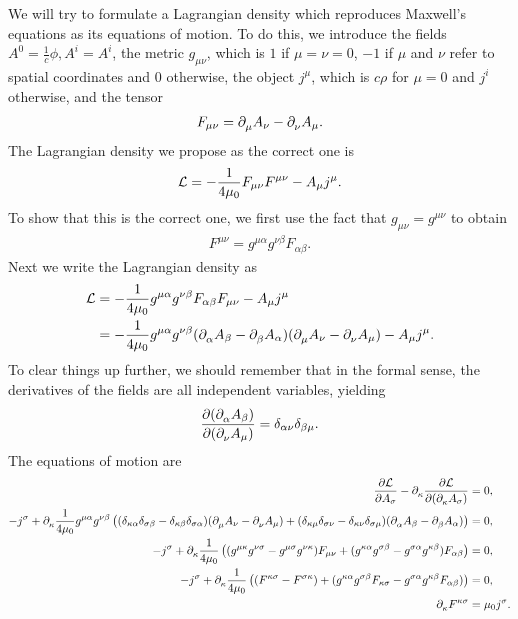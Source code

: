 We will try to formulate a Lagrangian density which reproduces Maxwell's equations as its equations of motion. To do this, we introduce the fields $A^{0} = \frac{1}{c}\phi, A^{i} = A^{i}$, the metric $g_{\mu\nu}$, which is $1$ if $\mu = \nu = 0$, $-1$ if $\mu$ and $\nu$ refer to spatial coordinates and $0$ otherwise, the object $j^{\mu}$, which is $c\rho$ for $\mu = 0$ and $j^{i}$ otherwise, and the tensor
\begin{align*}
	F_{\mu\nu} = \partial^{}_{\mu}{A_{\nu}} - \partial^{}_{\nu}{A_{\mu}}.
\end{align*}
The Lagrangian density we propose as the correct one is
\begin{align*}
	\mathcal{L} = -\frac{1}{4\mu_{0}}F_{\mu\nu}F^{\mu\nu} - A_{\mu}j^{\mu}.
\end{align*}
To show that this is the correct one, we first use the fact that $g_{\mu\nu} = g^{\mu\nu}$ to obtain
\begin{align*}
	F^{\mu\nu} = g^{\mu\alpha}g^{\nu\beta}F_{\alpha\beta}.
\end{align*}
Next we write the Lagrangian density as
\begin{align*}
	\mathcal{L} &= -\frac{1}{4\mu_{0}}g^{\mu\alpha}g^{\nu\beta}F_{\alpha\beta}F_{\mu\nu} - A_{\mu}j^{\mu} \\
	     &= -\frac{1}{4\mu_{0}}g^{\mu\alpha}g^{\nu\beta}(\partial^{}_{\alpha}{A_{\beta}} - \partial^{}_{\beta}{A_{\alpha}})(\partial^{}_{\mu}{A_{\nu}} - \partial^{}_{\nu}{A_{\mu}}) - A_{\mu}j^{\mu}.
\end{align*}
To clear things up further, we should remember that in the formal sense, the derivatives of the fields are all independent variables, yielding
\begin{align*}
	\pdv{(\ensuremath{\partial^{}_{\alpha}}{A_{\beta}})}{(\ensuremath{\partial^{}_{\nu}}{A_{\mu}})} = \delta_{\alpha\nu}\delta_{\beta\mu}.
\end{align*}
The equations of motion are
\begin{align*}
	\pdv{\ensuremath{\mathcal{L}}}{A_{\sigma}} - \partial^{}_{\kappa}{\pdv{\ensuremath{\mathcal{L}}}{(\ensuremath{\partial^{}_{\kappa}}{A_{\sigma}})}} &= 0, \\
	-j^{\sigma} + \partial^{}_{\kappa}{\frac{1}{4\mu_{0}}g^{\mu\alpha}g^{\nu\beta}\left((\delta_{\kappa\alpha}\delta_{\sigma\beta} - \delta_{\kappa\beta}\delta_{\sigma\alpha})(\partial^{}_{\mu}{A_{\nu}} - \partial^{}_{\nu}{A_{\mu}}) + (\delta_{\kappa\mu}\delta_{\sigma\nu} - \delta_{\kappa\nu}\delta_{\sigma\mu})(\partial^{}_{\alpha}{A_{\beta}} - \partial^{}_{\beta}{A_{\alpha}})\right)} &= 0, \\
	-j^{\sigma} + \partial^{}_{\kappa}{\frac{1}{4\mu_{0}}\left((g^{\mu\kappa}g^{\nu\sigma} - g^{\mu\sigma}g^{\nu\kappa})F_{\mu\nu} + (g^{\kappa\alpha}g^{\sigma\beta} - g^{\sigma\alpha}g^{\kappa\beta})F_{\alpha\beta}\right)} &= 0, \\
	-j^{\sigma} + \partial^{}_{\kappa}{\frac{1}{4\mu_{0}}\left((F^{\kappa\sigma} - F^{\sigma\kappa}) + (g^{\kappa\alpha}g^{\sigma\beta}F_{\kappa\sigma} - g^{\sigma\alpha}g^{\kappa\beta}F_{\alpha\beta})\right)} &= 0, \\
	\partial^{}_{\kappa}{F^{\kappa\sigma}} &= \mu_{0}j^{\sigma}.
\end{align*}

